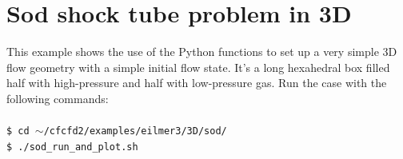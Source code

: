
\section{Sod shock tube problem in 3D}
%
This example shows the use of the Python functions to set up
a very simple 3D flow geometry with a simple initial flow state.
It's a long hexahedral box filled half with high-pressure and half with
low-pressure gas. Run the case with the following commands:\\
%
\topbar\\
\texttt{\$ cd $\sim$/cfcfd2/examples/eilmer3/3D/sod/}\\
\texttt{\$ ./sod\_run\_and\_plot.sh}\\
\bottombar\\
%

